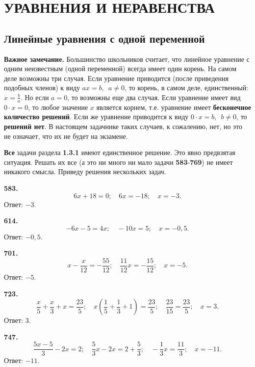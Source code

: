 \section{УРАВНЕНИЯ И НЕРАВЕНСТВА}
\subsection{Линейные уравнения с одной переменной}


\textbf{Важное замечание.} Большинство школьников считает, что линейное уравнение с одним неизвестным (одной переменной) всегда имеет один корень. На самом деле возможны три случая. Если уравнение приводится (после приведения подобных членов) к виду $ax=b,\enspace a\ne0$, то корень, в самом деле, единственный: $x=\frac{b}{a}$. Но если $a=0$, то возможны еще два случая. Если уравнение имеет вид  $0\cdot x=0$, то любое значение $x$ является корнем, т.е. уравнение имеет \textbf{бесконечное количество решений}.  Если же уравнение приводится к виду $0\cdot x=b,\enspace b\ne0$, то \textbf{решений нет}. В настоящем задачнике таких случаев, к сожалению, нет, но это не означает, что их не будет на экзамене. 

\textbf{Все}  задачи раздела  \textbf{1.3.1}  имеют единственное решение. Это явно предвзятая ситуация. Решать их все (а это ни много ни мало задачи  \textbf{583}-\textbf{769}) не имеет никакого смысла. Приведу решения нескольких задач. 

\textbf{583.}  $$6x+18=0;\quad6x=-18;\quad x=-3.$$ \newline \null \hspace*{\fill} Ответ: $-3$.     

\textbf{614.} $$-6x-5=4x;\quad -10x=5;\quad x=-0,5.$$ \newline \null \hspace*{\fill} Ответ: $-0,5$.  

\textbf{701.} $$x-\frac{x}{12}=-\frac{55}{12};\quad \frac{11}{12}x=-\frac{15}{12};\quad x=-5.$$ \newline \null \hspace*{\fill} Ответ: $-5$.   

\newpage \textbf{723.} $$\frac{x}{5}+\frac{x}{3}+x=\frac{23}{5};\quad x\left(\frac{1}{5}+\frac{1}{3}+1\right)=\frac{23}{5};\quad \frac{23}{15}=\frac{23}{5};\quad x=3.$$ \newline \null \hspace*{\fill} Ответ: $3$.    

\textbf{747.} $$\frac{5x-5}{3}-2x=2;\quad \frac{5}{3}x-2x=2+\frac{5}{3};\quad -\frac{1}{3}x=\frac{11}{3};\quad x=-11.$$ \newline \null \hspace*{\fill} Ответ: $-11$.    

